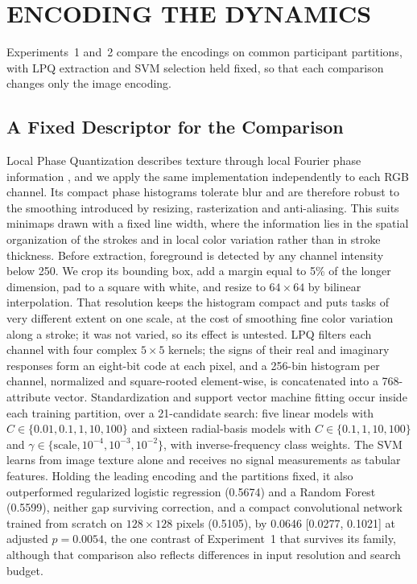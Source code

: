 \section{\uppercase{Encoding the Dynamics}}
\label{sec:representation-results}

\noindent
Experiments~1 and~2 compare the encodings on common participant partitions, with LPQ extraction and SVM selection held fixed, so that each comparison changes only the image encoding.

\subsection{A Fixed Descriptor for the Comparison}
\label{sec:descriptor}
\noindent
Local Phase Quantization describes texture through local Fourier phase information \cite{Ojansivu2008}, and we apply the same implementation independently to each RGB channel. Its compact phase histograms tolerate blur and are therefore robust to the smoothing introduced by resizing, rasterization and anti-aliasing. This suits minimaps drawn with a fixed line width, where the information lies in the spatial organization of the strokes and in local color variation rather than in stroke thickness.
Before extraction, foreground is detected by any channel intensity below 250. We crop its bounding box, add a margin equal to 5\% of the longer dimension, pad to a square with white, and resize to $64\times64$ by bilinear interpolation. That resolution keeps the histogram compact and puts tasks of very different extent on one scale, at the cost of smoothing fine color variation along a stroke; it was not varied, so its effect is untested. LPQ filters each channel with four complex $5\times5$ kernels; the signs of their real and imaginary responses form an eight-bit code at each pixel, and a 256-bin histogram per channel, normalized and square-rooted element-wise, is concatenated into a 768-attribute vector.
Standardization and support vector machine fitting \cite{Cortes1995} occur inside each training partition, over a 21-candidate search: five linear models with $C\in\{0.01,0.1,1,10,100\}$ and sixteen radial-basis models with $C\in\{0.1,1,10,100\}$ and $\gamma\in\{\mathrm{scale},10^{-4},10^{-3},10^{-2}\}$, with inverse-frequency class weights. The SVM learns from image texture alone and receives no signal measurements as tabular features. Holding the leading encoding and the partitions fixed, it also outperformed regularized logistic regression (0.5674) and a Random Forest \cite{Breiman2001} (0.5599), neither gap surviving correction, and a compact convolutional network trained from scratch on $128\times128$ pixels \cite{LeCun1998} (0.5105), by 0.0646 [0.0277, 0.1021] at adjusted $p=0.0054$, the one contrast of Experiment~1 that survives its family, although that comparison also reflects differences in input resolution and search budget.


